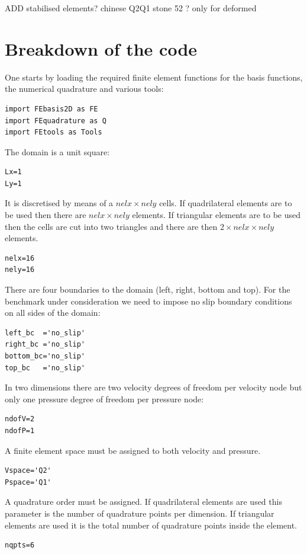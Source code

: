ADD stabilised elements?
chinese Q2Q1 stone 52 ? only for deformed

\section*{Breakdown of the code}

One starts by loading the required finite element functions 
for the basis functions, the numerical quadrature and various tools:
\begin{lstlisting}
import FEbasis2D as FE
import FEquadrature as Q
import FEtools as Tools 
\end{lstlisting}

The domain is a unit square:
\begin{lstlisting}
Lx=1
Ly=1
\end{lstlisting}

It is discretised by means of a $nelx\times nely$ cells. If quadrilateral 
elements are to be used then there are $nelx\times nely$ elements. If 
triangular elements are to be used then the cells are cut into two 
triangles and there are then $2\times nelx\times nely$ elements.

\begin{lstlisting}
nelx=16
nely=16
\end{lstlisting}

There are four boundaries to the domain (left, right, bottom and top). For the 
benchmark under consideration we need to impose no slip boundary conditions 
on all sides of the domain:
\begin{lstlisting}
left_bc  ='no_slip'
right_bc ='no_slip'
bottom_bc='no_slip'
top_bc   ='no_slip'
\end{lstlisting}

In two dimensions there are two velocity degrees of freedom per 
velocity node but only one pressure degree of freedom per pressure node:
\begin{lstlisting}
ndofV=2
ndofP=1
\end{lstlisting}

A finite element space must be assigned to both velocity and pressure. 
\begin{lstlisting}
Vspace='Q2'
Pspace='Q1'
\end{lstlisting}

A quadrature order must be assigned. If quadrilateral elements are used
this parameter is the number of quadrature points per dimension. 
If triangular elements are used it is the total number of quadrature points 
inside the element.  
\begin{lstlisting}
nqpts=6
\end{lstlisting}

